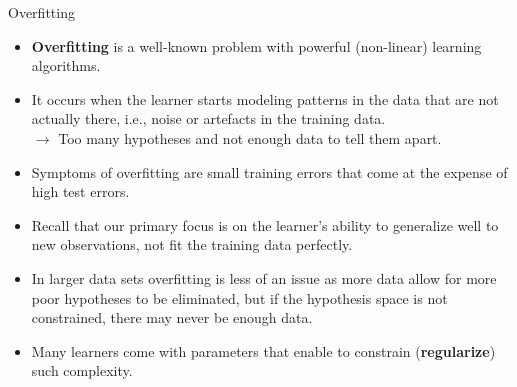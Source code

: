 \begin{vbframe}{Overfitting}
\framebreak

\begin{itemize}
  \item \textbf{Overfitting} is a well-known problem with powerful 
  (non-linear) learning algorithms.
  \item It occurs when the learner starts modeling patterns in the data 
  that are not actually there, i.e., noise or artefacts in the training data. \\
  $\rightarrow$ Too many hypotheses and not enough data to tell them apart.
  \item Symptoms of overfitting are small training errors that come at the 
  expense of high test errors.
  \item Recall that our primary focus is on the learner's ability to generalize 
  well to new observations, not fit the training data perfectly.
  \item In larger data sets overfitting is less of an issue as more data allow 
  for more poor hypotheses to be eliminated, but if the hypothesis space is not 
  constrained, there may never be enough data.
  \item Many learners come with parameters that enable to constrain 
  (\textbf{regularize}) such complexity.
\end{itemize}

\end{vbframe}


% 
% 


